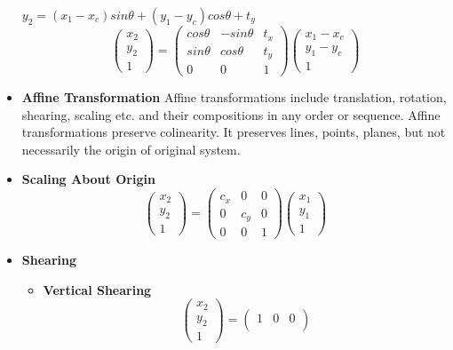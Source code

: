 \documentclass{report}
\begin{document}
\begin{itemize}
    $ y_2 = (x_1 - x_c) sin\theta + (y_1 - y_c)cos\theta + t_y $
    \[
    \begin{pmatrix}
        x_2\\
        y_2\\
        1
    \end{pmatrix}
    =
    \begin{pmatrix}
        cos\theta & -sin\theta & t_x\\
        sin\theta & cos\theta & t_y\\
        0 & 0 & 1
    \end{pmatrix}
    \begin{pmatrix}
        x_1 - x_c\\
        y_1 - y_c\\
        1
    \end{pmatrix}
    \]
    \item \textbf{Affine Transformation} Affine transformations include translation, rotation, shearing, scaling etc. and their compositions in any order or sequence. Affine transformations preserve colinearity. It preserves lines, points, planes, but not necessarily the origin of original system.
    \item \textbf{Scaling About Origin} 
    \[
    \begin{pmatrix}
        x_2\\
        y_2\\
        1
    \end{pmatrix}
    =
    \begin{pmatrix}
        c_x & 0 & 0\\
        0 & c_y & 0\\
        0 & 0 & 1
    \end{pmatrix}
    \begin{pmatrix}
        x_1 \\
        y_1 \\
        1
    \end{pmatrix}
    \]
    \item \textbf{Shearing}
    \begin{itemize}
        \item \textbf{Vertical Shearing}
        \[
    \begin{pmatrix}
        x_2\\
        y_2\\
        1
    \end{pmatrix}
    =
    \begin{pmatrix}
        1 & 0 & 0\\

\end{pmatrix}\]
\end{itemize}
\end{itemize}
\end{document}
